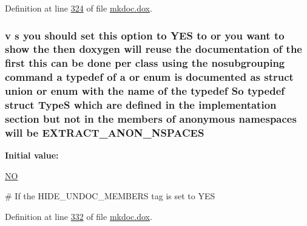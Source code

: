 Definition at line \hyperlink{mkdoc_8dox_source_l00324}{324} of file \hyperlink{mkdoc_8dox_source}{mkdoc.\-dox}.

\hypertarget{mkdoc_8dox_a7e1f20bfa451cb50f83a07ffe19863e7}{
\subsubsection[{E\-X\-T\-R\-A\-C\-T\-\_\-\-A\-N\-O\-N\-\_\-\-N\-S\-P\-A\-C\-E\-S}]{\setlength{\rightskip}{0pt plus 5cm}v s you should set this option to Y\-E\-S to or you want to show the then doxygen will reuse the documentation of the first this can be done per class using the nosubgrouping command a typedef of a or enum is documented as {\bf struct} {\bf union} or enum with the name of the typedef So typedef {\bf struct} {\bf Type\-S} which {\bf are} defined in the implementation section but not in the members of anonymous namespaces will be E\-X\-T\-R\-A\-C\-T\-\_\-\-A\-N\-O\-N\-\_\-\-N\-S\-P\-A\-C\-E\-S}}\label{mkdoc_8dox_a7e1f20bfa451cb50f83a07ffe19863e7}
{\bfseries Initial value\-:}
\begin{DoxyCode}
 \hyperlink{mkdoc_8dox_a0f6a46245280dc38baf9600906aa1393}{NO}

\textcolor{preprocessor}{# If the HIDE\_UNDOC\_MEMBERS tag is set to YES}
\end{DoxyCode}


Definition at line \hyperlink{mkdoc_8dox_source_l00332}{332} of file \hyperlink{mkdoc_8dox_source}{mkdoc.\-dox}.

